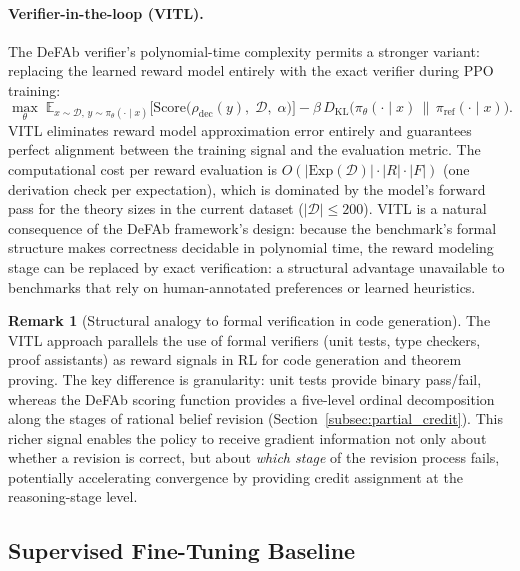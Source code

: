 \documentclass{article}
\theoremstyle{definition}
\newtheorem{remark}[theorem]{Remark}
\newcommand{\D}{\mathcal{D}}
\newcommand{\Exp}{\mathrm{Exp}}
\begin{document}
\paragraph{Verifier-in-the-loop (VITL).} The DeFAb verifier's polynomial-time complexity permits a stronger variant: replacing the learned reward model entirely with the exact verifier during PPO training:
\begin{equation}\label{eq:vitl}
    \max_\theta \; \mathbb{E}_{x \sim \mathcal{D},\, y \sim \pi_\theta(\cdot \mid x)} \bigl[ \mathrm{Score}\!\bigl(\rho_{\mathrm{dec}}(y),\; \D,\; \alpha\bigr) \bigr] - \beta \, D_{\mathrm{KL}}\!\bigl(\pi_\theta(\cdot \mid x) \,\big\|\, \pi_{\mathrm{ref}}(\cdot \mid x)\bigr).
\end{equation}
VITL eliminates reward model approximation error entirely and guarantees perfect alignment between the training signal and the evaluation metric. The computational cost per reward evaluation is $O(|\Exp(\D)| \cdot |R| \cdot |F|)$ (one derivation check per expectation), which is dominated by the model's forward pass for the theory sizes in the current dataset ($|\D| \leq 200$). VITL is a natural consequence of the DeFAb framework's design: because the benchmark's formal structure makes correctness decidable in polynomial time, the reward modeling stage can be replaced by exact verification: a structural advantage unavailable to benchmarks that rely on human-annotated preferences or learned heuristics.

\begin{remark}[Structural analogy to formal verification in code generation]\label{rem:vitl}
The VITL approach parallels the use of formal verifiers (unit tests, type checkers, proof assistants) as reward signals in RL for code generation and theorem proving. The key difference is granularity: unit tests provide binary pass/fail, whereas the DeFAb scoring function provides a five-level ordinal decomposition along the stages of rational belief revision (Section~\ref{subsec:partial_credit}). This richer signal enables the policy to receive gradient information not only about whether a revision is correct, but about \emph{which stage} of the revision process fails, potentially accelerating convergence by providing credit assignment at the reasoning-stage level.
\end{remark}


\subsection{Supervised Fine-Tuning Baseline}\label{subsec:sft}
\end{document}
